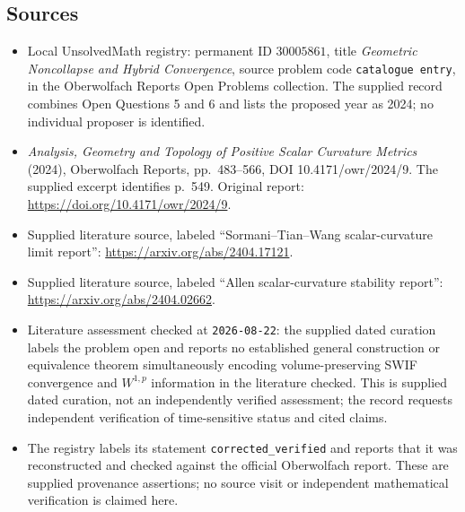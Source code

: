 \documentclass[11pt]{article}
\begin{document}
\subsection{Sources}
\begin{itemize}
\item Local UnsolvedMath registry: permanent ID \(30005861\), title \emph{Geometric Noncollapse and Hybrid Convergence}, source problem code \texttt{catalogue entry}, in the Oberwolfach Reports Open Problems collection. The supplied record combines Open Questions 5 and 6 and lists the proposed year as 2024; no individual proposer is identified.
\item \emph{Analysis, Geometry and Topology of Positive Scalar Curvature Metrics} (2024), Oberwolfach Reports, pp.~483--566, DOI 10.4171/owr/2024/9. The supplied excerpt identifies p.~549. Original report: \url{https://doi.org/10.4171/owr/2024/9}.
\item Supplied literature source, labeled ``Sormani--Tian--Wang scalar-curvature limit report'': \url{https://arxiv.org/abs/2404.17121}.
\item Supplied literature source, labeled ``Allen scalar-curvature stability report'': \url{https://arxiv.org/abs/2404.02662}.
\item Literature assessment checked at \texttt{2026-08-22}: the supplied dated curation labels the problem open and reports no established general construction or equivalence theorem simultaneously encoding volume-preserving SWIF convergence and \(W^{1,p}\) information in the literature checked. This is supplied dated curation, not an independently verified assessment; the record requests independent verification of time-sensitive status and cited claims.
\item The registry labels its statement \texttt{corrected\_verified} and reports that it was reconstructed and checked against the official Oberwolfach report. These are supplied provenance assertions; no source visit or independent mathematical verification is claimed here.
\end{itemize}
\end{document}
